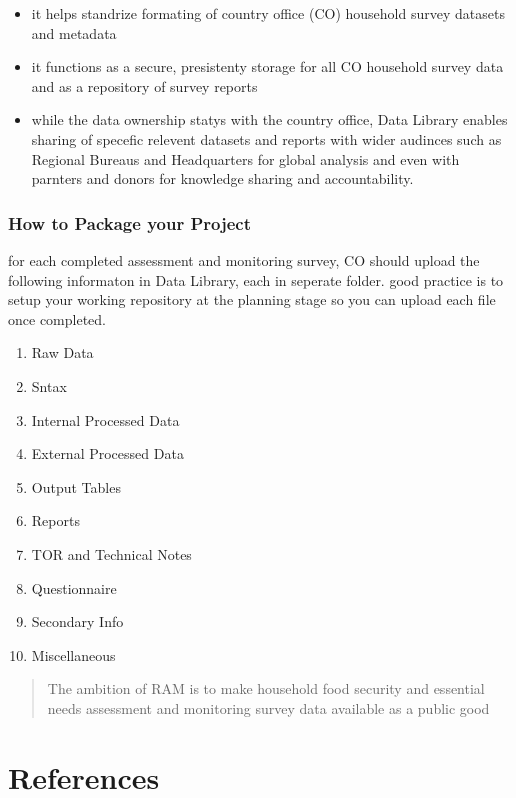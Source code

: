 \documentclass[
  letterpaper,
  DIV=11,
  numbers=noendperiod]{scrreprt}
\providecommand{\tightlist}{%
  \setlength{\itemsep}{0pt}\setlength{\parskip}{0pt}}\usepackage{longtable,booktabs,array}
\newlength{\cslhangindent}
\newenvironment{CSLReferences}[2] %
 {\begin{list}{}{%
  \setlength{\itemindent}{0pt}
  \setlength{\leftmargin}{0pt}
  \setlength{\parsep}{0pt}
  \ifodd #1
   \setlength{\leftmargin}{\cslhangindent}
   \setlength{\itemindent}{-1\cslhangindent}
  \fi
  \setlength{\itemsep}{#2\baselineskip}}}
 {\end{list}}
\begin{document}
\begin{itemize}
\tightlist
\item
  it helps standrize formating of country office (CO) household survey
  datasets and metadata
\item
  it functions as a secure, presistenty storage for all CO household
  survey data and as a repository of survey reports
\item
  while the data ownership statys with the country office, Data Library
  enables sharing of specefic relevent datasets and reports with wider
  audinces such as Regional Bureaus and Headquarters for global analysis
  and even with parnters and donors for knowledge sharing and
  accountability.
\end{itemize}

\subsection{How to Package your
Project}\label{how-to-package-your-project}

for each completed assessment and monitoring survey, CO should upload
the following informaton in Data Library, each in seperate folder. good
practice is to setup your working repository at the planning stage so
you can upload each file once completed.

\begin{enumerate}
\def\labelenumi{\arabic{enumi}.}
\tightlist
\item
  Raw Data
\item
  Sntax
\item
  Internal Processed Data
\item
  External Processed Data
\item
  Output Tables
\item
  Reports
\item
  TOR and Technical Notes
\item
  Questionnaire
\item
  Secondary Info
\item
  Miscellaneous
\end{enumerate}

\begin{quote}
The ambition of RAM is to make household food security and essential
needs assessment and monitoring survey data available as a public good
\end{quote}


\chapter*{References}\label{references}


\label{refs}
\begin{CSLReferences}{0}{1}
\end{CSLReferences}
\end{document}
